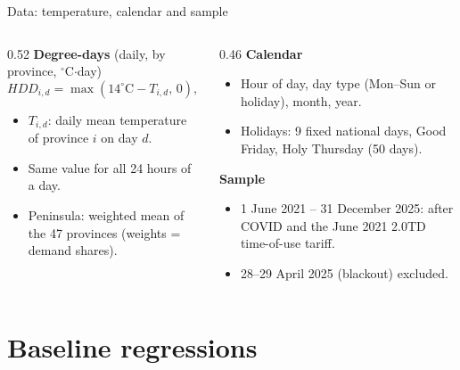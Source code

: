 \documentclass[aspectratio=169,11pt]{beamer}
\begin{document}
\begin{frame}{Data: temperature, calendar and sample}
  \begin{columns}[T]
    \begin{column}{0.52\textwidth}
      \textbf{Degree-days} (daily, by province, $^{\circ}$C$\cdot$day)
      \[
        HDD_{i,d} = \max(14^{\circ}\mathrm{C} - T_{i,d},\,0), \quad
        CDD_{i,d} = \max(T_{i,d} - 21^{\circ}\mathrm{C},\,0)
      \]
      \vspace{-6pt}
      \begin{itemize}\small
        \item $T_{i,d}$: daily mean temperature of province $i$ on day $d$.
        \item Same value for all 24 hours of a day.
        \item Peninsula: weighted mean of the 47 provinces (weights = demand shares).
      \end{itemize}
    \end{column}
    \begin{column}{0.46\textwidth}
      \textbf{Calendar}
      \begin{itemize}\small
        \item Hour of day, day type (Mon--Sun or holiday), month, year.
        \item Holidays: 9 fixed national days, Good Friday, Holy Thursday (50 days).
      \end{itemize}
      \textbf{Sample}
      \begin{itemize}\small
        \item 1 June 2021 -- 31 December 2025: after COVID and the June 2021 2.0TD
              time-of-use tariff.
        \item 28--29 April 2025 (blackout) excluded.
      \end{itemize}
    \end{column}
  \end{columns}
\end{frame}

\section{Baseline regressions}
\end{document}
